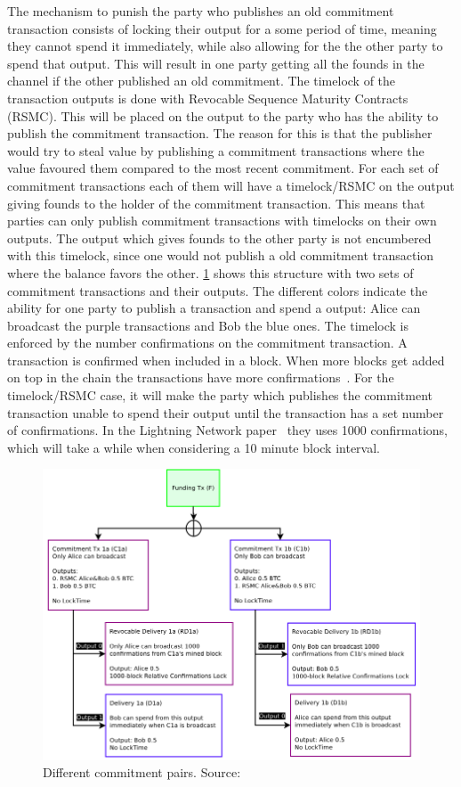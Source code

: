 The mechanism to punish the party who publishes an old commitment transaction consists of locking their output for a some period of time, meaning they cannot spend it immediately, while also allowing for the the other party to spend that output. 
This will result in one party getting all the founds in the channel if the other published an old commitment. The timelock of the transaction outputs is done with Revocable Sequence Maturity Contracts (RSMC). 
This will be placed on the output to the party who has the ability to publish the commitment transaction. The reason for this is that the publisher would try to steal value by publishing a commitment transactions where the value favoured them compared to the most recent commitment. 
For each set of commitment transactions each of them will have a timelock/RSMC on the output giving founds to the holder of the commitment transaction. This means that parties can only publish commitment transactions with timelocks on their own outputs.
The output which gives founds to the other party is not encumbered with this timelock, since one would not publish a old commitment transaction where the balance favors the other. 
\cref{fig:ln_timeout} shows this structure with two sets of commitment transactions and their outputs. The different colors indicate the ability for one party to publish a transaction and spend a output: Alice can broadcast the purple transactions and Bob the blue ones. The timelock is enforced by the number confirmations on the commitment transaction. A transaction is confirmed when included in a block. When more blocks get added on top in the chain the transactions have more confirmations~\cite{antonopoulos2017mastering}. For the timelock/RSMC case, it will make the party which publishes the commitment transaction unable to spend their output until the transaction has a set number of confirmations. In the Lightning Network paper~\cite{poon2015bitcoin} they uses 1000 confirmations, which will take a while when considering a 10 minute block interval.
\\

\begin{figure}[ht]
    \centering
    \includegraphics[width=12cm]{figures/ln_timeout.png}
    \caption{Different commitment pairs. Source:~\cite{poon2015bitcoin}}
    \label{fig:ln_timeout}
\end{figure}

